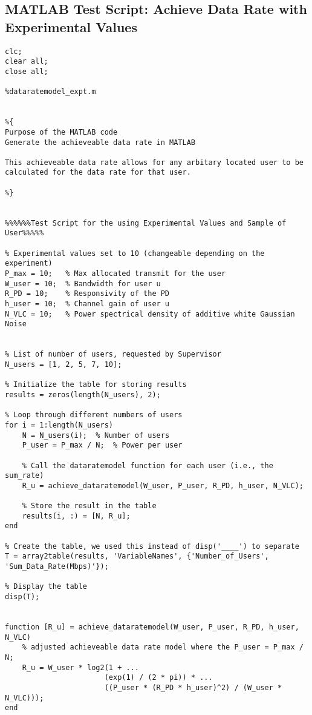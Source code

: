 \subsection{MATLAB Test Script: Achieve Data Rate with Experimental Values}

\begin{lstlisting}
clc; 
clear all; 
close all;

%dataratemodel_expt.m


%{ 
Purpose of the MATLAB code
Generate the achieveable data rate in MATLAB

This achieveable data rate allows for any arbitary located user to be
calculated for the data rate for that user.

%}


%%%%%%Test Script for the using Experimental Values and Sample of User%%%%%

% Experimental values set to 10 (changeable depending on the experiment)
P_max = 10;   % Max allocated transmit for the user 
W_user = 10;  % Bandwidth for user u
R_PD = 10;    % Responsivity of the PD
h_user = 10;  % Channel gain of user u
N_VLC = 10;   % Power spectrical density of additive white Gaussian Noise 


% List of number of users, requested by Supervisor
N_users = [1, 2, 5, 7, 10];

% Initialize the table for storing results
results = zeros(length(N_users), 2);

% Loop through different numbers of users
for i = 1:length(N_users)
    N = N_users(i);  % Number of users
    P_user = P_max / N;  % Power per user
    
    % Call the dataratemodel function for each user (i.e., the sum_rate)
    R_u = achieve_dataratemodel(W_user, P_user, R_PD, h_user, N_VLC);
    
    % Store the result in the table
    results(i, :) = [N, R_u];
end

% Create the table, we used this instead of disp('____') to separate
T = array2table(results, 'VariableNames', {'Number_of_Users', 'Sum_Data_Rate(Mbps)'});

% Display the table
disp(T);


function [R_u] = achieve_dataratemodel(W_user, P_user, R_PD, h_user, N_VLC)
    % adjusted achieveable data rate model where the P_user = P_max / N; 
    R_u = W_user * log2(1 + ...
                       (exp(1) / (2 * pi)) * ...
                       ((P_user * (R_PD * h_user)^2) / (W_user * N_VLC)));
end
\end{lstlisting}


